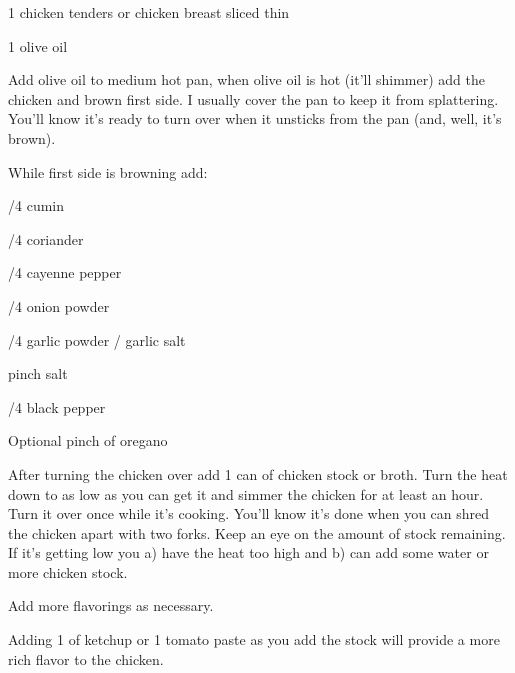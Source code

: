 \begin{IngredientsAndSteps}
    \ListIngredientsAndSteps
    {
        1 \Pd chicken tenders or chicken breast sliced thin

        1 \Tbl olive oil
    }
    {
        Add olive oil to medium hot pan, when olive oil is hot (it'll shimmer) add the chicken and
        brown first side. I usually cover the pan to keep it from splattering. You'll know it's
        ready to turn over when it unsticks from the pan (and, well, it's brown).

        While first side is browning add:
    }

    \ListIngredientsAndSteps
    {
        /4 \tsp cumin

        /4 \tsp coriander

        /4 \tsp cayenne pepper

        /4 \tsp onion powder

        /4 \tsp garlic powder / garlic salt

        pinch salt

        /4 \tsp black pepper

        Optional pinch of oregano
    }
    {
        After turning the chicken over add 1 can of chicken stock or broth. Turn
        the heat down to as low as you can get it and simmer the chicken for at least
        an hour. Turn it over once while it's cooking. You'll know it's done when you
        can shred the chicken apart with two forks. Keep an eye on the amount of stock
        remaining. If it's getting low you a) have the heat too high and b) can add
        some water or more chicken stock.

        Add more flavorings as necessary.
    }
\end{IngredientsAndSteps}

\begin{ChefNotes}
    {Adding 1 \Tbl of ketchup or 1 \Tbl tomato paste as you add the stock will provide a
        more rich flavor to the chicken.}
\end{ChefNotes}

%
%
%
%
\newpage



